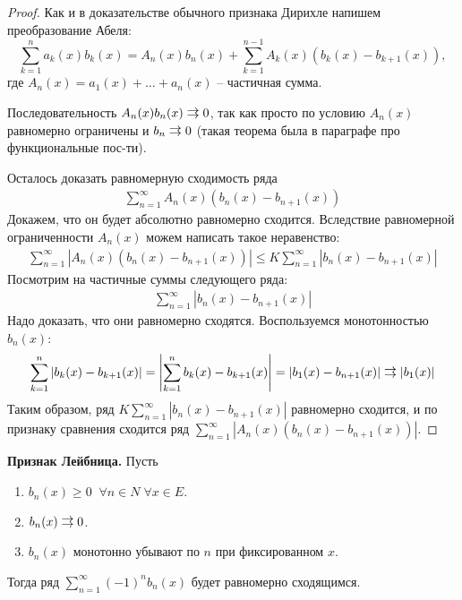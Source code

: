 \begin{proof}
    Как и в доказательстве обычного признака Дирихле напишем преобразование Абеля: \[ \sum_{k=1}^n a_k(x)b_k(x) = A_n(x)b_n(x) + \sum_{k=1}^{n-1} A_k(x)(b_k(x) - b_{k+1}(x)), \]
    где $A_n(x) = a_1(x) + \dots + a_n(x)$ -- частичная сумма.

    \quad Последовательность $A_n(x)b_n(x) \doublerightarrow 0$, так как просто по условию $A_n(x)$ равномерно ограничены и $b_n \doublerightarrow 0$ (такая теорема была в параграфе про функциональные пос-ти).

    \quad Осталось доказать равномерную сходимость ряда 
    \begin{gather*}
        \sum\limits_{n = 1}^\infty A_n(x)(b_n(x) - b_{n+1}(x))
    \end{gather*}
    Докажем, что он будет абсолютно равномерно сходится.
    Вследствие равномерной ограниченности $A_n(x)$ можем написать такое неравенство: 
    \begin{gather*}
        \sum\limits_{n = 1}^\infty \left|A_n(x)(b_n(x) - b_{n+1}(x))\right| \leqslant K\sum\limits_{n = 1}^\infty \left|b_n(x) - b_{n+1}(x)\right|
    \end{gather*}
    Посмотрим на частичные суммы следующего ряда:
    \begin{gather*}
        \sum\limits_{n = 1}^\infty \left|b_n(x) - b_{n+1}(x)\right|
    \end{gather*}
    Надо доказать, что они равномерно сходятся.
    Воспользуемся монотонностью $b_n(x)$: \[ \sum\limits_{k = 1}^n \left|b_k(x) - b_{k+1}(x)\right| = \left|\sum\limits_{k = 1}^n b_k(x) - b_{k+1}(x)\right| = |b_1(x) - b_{n+1}(x)| \doublerightarrow |b_1(x)| \]
    \quad Таким образом, ряд $K\sum\limits_{n = 1}^\infty \left|b_n(x) - b_{n+1}(x)\right|$ равномерно сходится, и по признаку сравнения сходится ряд $\sum\limits_{n = 1}^\infty \left|A_n(x)(b_n(x) - b_{n+1}(x))\right|$.
\end{proof}

\textbf{Признак Лейбница.} Пусть \begin{enumerate}
    \item $b_n(x) \geqslant 0 \;\; \forall n \in N \; \forall x \in E$.
    \item $b_n(x) \doublerightarrow 0$.
    \item $b_n(x)$ монотонно убывают по $n$ при фиксированном $x$.
\end{enumerate}
Тогда ряд $\sum\limits_{n = 1}^\infty (-1)^nb_n(x)$ будет равномерно сходящимся.

